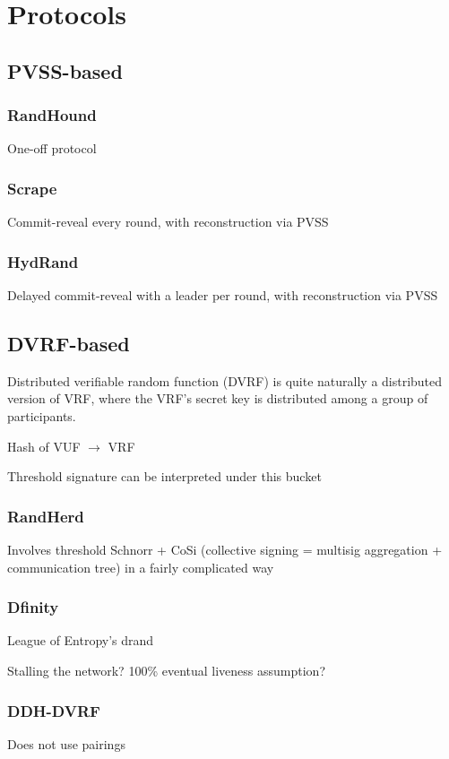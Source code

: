 \documentclass[11pt]{article}
\theoremstyle{definition}
\theoremstyle{remark}
\begin{document}
\section{Protocols}
\subsection{PVSS-based}


\subsubsection{RandHound}
One-off protocol

\subsubsection{Scrape}
Commit-reveal every round, with reconstruction via PVSS

\subsubsection{HydRand}
Delayed commit-reveal with a leader per round, with reconstruction via PVSS

\subsection{DVRF-based}
Distributed verifiable random function (DVRF) is quite naturally a distributed version of VRF, where the VRF's secret key is distributed among a group of participants.

Hash of VUF $\rightarrow$ VRF

Threshold signature can be interpreted under this bucket

\subsubsection{RandHerd}
Involves threshold Schnorr + CoSi (collective signing = multisig aggregation + communication tree) in a fairly complicated way

\subsubsection{Dfinity}
League of Entropy's drand

Stalling the network? 100\% eventual liveness assumption?
\subsubsection{DDH-DVRF}
Does not use pairings
\end{document}
